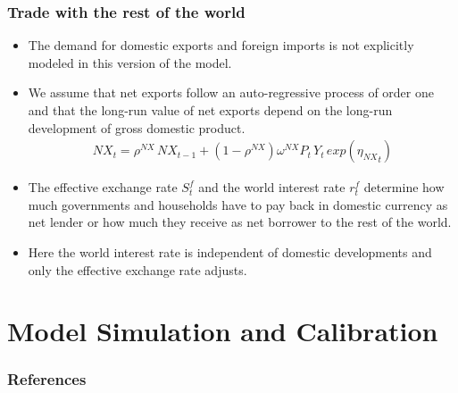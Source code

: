 \documentclass[11pt,aspectratio=169]{beamer}
\begin{document}
\begin{frame}
\frametitle{Trade with the rest of the world}
\scriptsize
\begin{itemize}
\item The demand for domestic exports and foreign imports is not explicitly modeled in this version of the model. 
\item We assume that net exports follow an auto-regressive process of order one and that the long-run value of net exports depend on the long-run development of gross domestic product.
\begin{align*}
NX_{t} = \rho^{NX} \, NX_{t-1} + (1 - \rho^{NX}) \omega^{NX} P_{t} \, Y_{t} \, exp\left({{\eta_{NX}}_{t}}\right)
\end{align*}
\item The effective exchange rate $S^f_{t}$ and the world interest rate $r^{f}_{t}$ determine how much governments and households have to pay back in domestic currency as net lender or how much they receive as net borrower to the rest of the world. \item Here the world interest rate is independent of domestic developments and only the effective exchange rate adjusts.
\end{itemize}
\end{frame}

\section{Model Simulation and Calibration}

\begin{frame}[allowframebreaks]%
\frametitle{References}
\scriptsize{
\printbibliography}
\end{frame}
\end{document}
